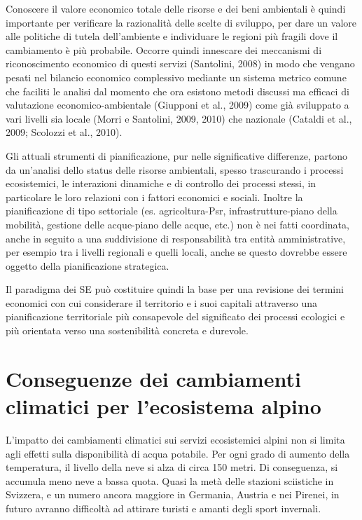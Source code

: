 \documentclass[11pt,a4paper]{article}
\begin{document}
	Conoscere il valore economico totale delle risorse e dei beni ambientali è quindi importante per verificare la razionalità delle scelte di sviluppo, per dare un valore alle politiche di tutela dell'ambiente e individuare le regioni più fragili dove il cambiamento è più probabile. Occorre quindi innescare dei meccanismi di riconoscimento economico di questi servizi (Santolini, 2008) in modo che vengano pesati nel bilancio economico complessivo mediante un sistema metrico comune che  faciliti le analisi dal momento che ora esistono metodi discussi ma efficaci di valutazione economico-ambientale (Giupponi et al., 2009) come già sviluppato a vari livelli sia locale (Morri e Santolini, 2009, 2010) che nazionale (Cataldi et al., 2009; Scolozzi et al., 2010). 
	
	Gli attuali strumenti di pianificazione, pur nelle significative differenze, partono da un'analisi dello status delle risorse ambientali, spesso trascurando i processi ecosistemici, le interazioni dinamiche e di controllo dei processi stessi, in particolare le loro relazioni con i fattori economici e sociali. Inoltre la pianificazione di tipo settoriale (es. agricoltura-Psr, infrastrutture-piano della mobilità, gestione delle acque-piano delle acque, etc.) non è nei fatti coordinata, anche in seguito a una suddivisione di responsabilità tra entità amministrative, per esempio tra i livelli regionali e quelli 	locali, anche se questo dovrebbe essere oggetto della pianificazione strategica. 
	
	Il paradigma dei SE può costituire quindi la base per una revisione dei termini economici con cui considerare il territorio e i suoi capitali attraverso una  pianificazione territoriale più consapevole del significato dei processi ecologici e più orientata verso una sostenibilità concreta e durevole.
	
	
	\section{Conseguenze dei cambiamenti climatici per l'ecosistema alpino \cite{LeAlpi}}
	
	L'impatto dei cambiamenti climatici sui servizi ecosistemici alpini non si limita agli effetti sulla disponibilità di acqua potabile. Per ogni grado di aumento della temperatura, il livello della neve si alza di circa 150 metri. Di conseguenza, si accumula meno neve a bassa quota. Quasi la metà delle stazioni sciistiche in Svizzera, e un numero ancora maggiore in Germania, Austria e nei Pirenei, in futuro avranno difficoltà ad attirare turisti e amanti degli sport invernali.
	
\end{document}
